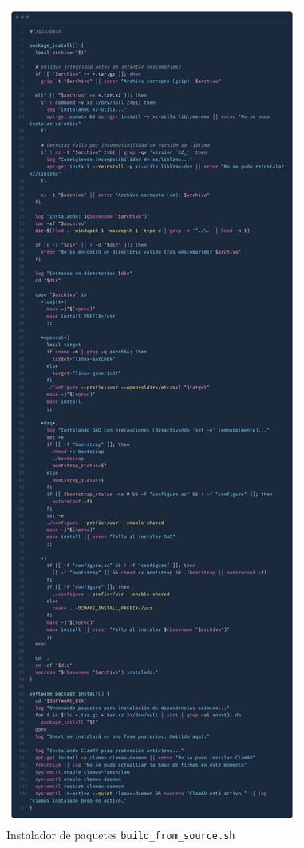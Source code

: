 \documentclass[11pt,a4paper,twoside]{report}
\begin{document}
\begin{figure}[H]
	\centering
	\includegraphics[scale=0.065]{script_automatico/5.png}
	\caption{Instalador de paquetes \texttt{build\_from\_source.sh}}
	\label{fig:build-from-source}
\end{figure}
\end{document}
